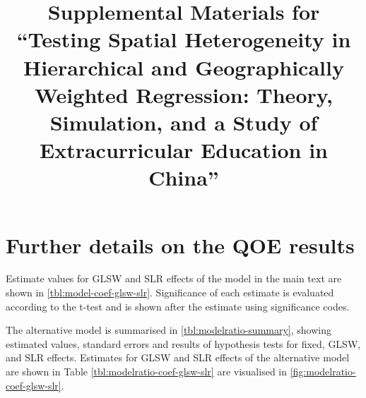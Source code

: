 \documentclass[12pt]{article}
\begin{document}
\def\spacingset#1{\renewcommand{\baselinestretch}%
{#1}\small\normalsize} \spacingset{1}

\title{Supplemental Materials for ``Testing Spatial Heterogeneity in Hierarchical and Geographically Weighted Regression: Theory, Simulation, and a Study of Extracurricular Education in China''}
\author{}

\maketitle

\spacingset{1.8}

\section{Further details on the QOE results}\label{app:further-details}

Estimate values for GLSW and SLR effects of the model in the main text are shown in \autoref{tbl:model-coef-glsw-slr}.
Significance of each estimate is evaluated according to the t-test and is shown after the estimate using significance codes.

The alternative model is summarised in \autoref{tbl:modelratio-summary}, showing estimated values, standard errors and results of hypothesis tests for fixed, GLSW, and SLR effects.
Estimates for GLSW and SLR effects of the alternative model are shown in Table \autoref{tbl:modelratio-coef-glsw-slr} are visualised in \autoref{fig:modelratio-coef-glsw-slr}.
\end{document}
